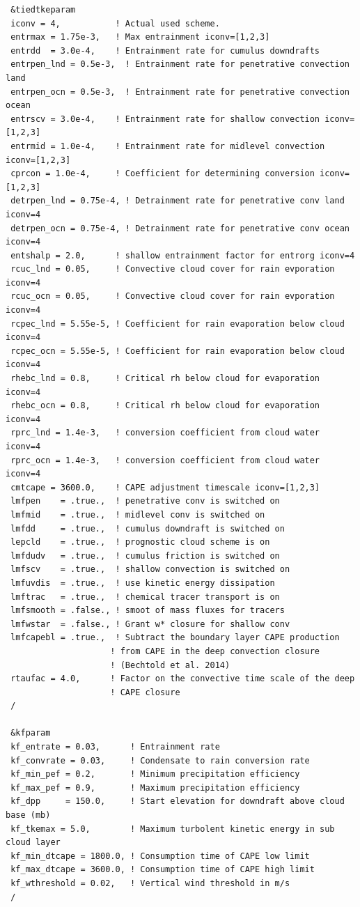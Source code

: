 {\begin{Verbatim}
 &tiedtkeparam
 iconv = 4,           ! Actual used scheme.
 entrmax = 1.75e-3,   ! Max entrainment iconv=[1,2,3]
 entrdd  = 3.0e-4,    ! Entrainment rate for cumulus downdrafts
 entrpen_lnd = 0.5e-3,  ! Entrainment rate for penetrative convection land
 entrpen_ocn = 0.5e-3,  ! Entrainment rate for penetrative convection ocean
 entrscv = 3.0e-4,    ! Entrainment rate for shallow convection iconv=[1,2,3]
 entrmid = 1.0e-4,    ! Entrainment rate for midlevel convection iconv=[1,2,3]
 cprcon = 1.0e-4,     ! Coefficient for determining conversion iconv=[1,2,3]
 detrpen_lnd = 0.75e-4, ! Detrainment rate for penetrative conv land iconv=4
 detrpen_ocn = 0.75e-4, ! Detrainment rate for penetrative conv ocean iconv=4
 entshalp = 2.0,      ! shallow entrainment factor for entrorg iconv=4
 rcuc_lnd = 0.05,     ! Convective cloud cover for rain evporation iconv=4
 rcuc_ocn = 0.05,     ! Convective cloud cover for rain evporation iconv=4
 rcpec_lnd = 5.55e-5, ! Coefficient for rain evaporation below cloud iconv=4
 rcpec_ocn = 5.55e-5, ! Coefficient for rain evaporation below cloud iconv=4
 rhebc_lnd = 0.8,     ! Critical rh below cloud for evaporation iconv=4
 rhebc_ocn = 0.8,     ! Critical rh below cloud for evaporation iconv=4
 rprc_lnd = 1.4e-3,   ! conversion coefficient from cloud water iconv=4
 rprc_ocn = 1.4e-3,   ! conversion coefficient from cloud water iconv=4
 cmtcape = 3600.0,    ! CAPE adjustment timescale iconv=[1,2,3]
 lmfpen    = .true.,  ! penetrative conv is switched on
 lmfmid    = .true.,  ! midlevel conv is switched on
 lmfdd     = .true.,  ! cumulus downdraft is switched on
 lepcld    = .true.,  ! prognostic cloud scheme is on
 lmfdudv   = .true.,  ! cumulus friction is switched on
 lmfscv    = .true.,  ! shallow convection is switched on
 lmfuvdis  = .true.,  ! use kinetic energy dissipation
 lmftrac   = .true.,  ! chemical tracer transport is on
 lmfsmooth = .false., ! smoot of mass fluxes for tracers
 lmfwstar  = .false., ! Grant w* closure for shallow conv
 lmfcapebl = .true.,  ! Subtract the boundary layer CAPE production
                     ! from CAPE in the deep convection closure
                     ! (Bechtold et al. 2014)
 rtaufac = 4.0,      ! Factor on the convective time scale of the deep
                     ! CAPE closure
 /

 &kfparam
 kf_entrate = 0.03,      ! Entrainment rate
 kf_convrate = 0.03,     ! Condensate to rain conversion rate
 kf_min_pef = 0.2,       ! Minimum precipitation efficiency
 kf_max_pef = 0.9,       ! Maximum precipitation efficiency
 kf_dpp     = 150.0,     ! Start elevation for downdraft above cloud base (mb)
 kf_tkemax = 5.0,        ! Maximum turbolent kinetic energy in sub cloud layer
 kf_min_dtcape = 1800.0, ! Consumption time of CAPE low limit
 kf_max_dtcape = 3600.0, ! Consumption time of CAPE high limit
 kf_wthreshold = 0.02,   ! Vertical wind threshold in m/s
 /
\end{Verbatim}
}

